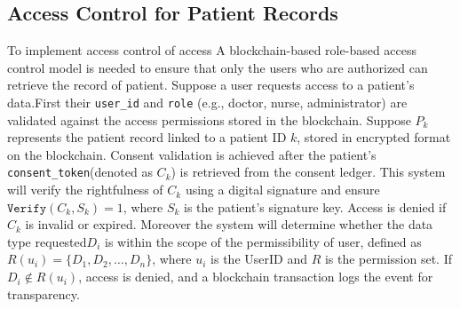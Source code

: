 \documentclass[pdflatex,sn-mathphys-num]{sn-jnl}%
\theoremstyle{thmstyleone}%
\theoremstyle{thmstyletwo}%
\theoremstyle{thmstylethree}%
\begin{document}




\subsection{Access Control for Patient Records}
To implement access control of access A blockchain-based role-based access control model is needed to ensure that only the users who are authorized can retrieve the record of patient\cite{bib17}. Suppose a user requests access to a patient's data.First their \texttt{user\_id} and \texttt{role} (e.g., doctor, nurse, administrator) are validated against the access permissions stored in the blockchain. Suppose \( P_k \) represents the patient record linked to a patient ID \( k \), stored in encrypted format on the blockchain. Consent validation is achieved after the patient’s \texttt{consent\_token}(denoted as \( C_k \)) is retrieved from the consent ledger. This system will verify the rightfulness of \( C_k \) using a digital signature and ensure \( \texttt{Verify}(C_k, S_k) = 1 \), where \( S_k \) is the patient’s signature key\cite{bib17}. Access is denied if \( C_k \) is invalid or expired. Moreover the system will determine whether the data type requested\( D_i \) is within the scope of the permissibility of user, defined as \( R(u_i) = \{D_1, D_2, \dots, D_n\} \), where \( u_i \) is the UserID and \( R \) is the permission set. If \( D_i \notin R(u_i) \), access is denied, and a blockchain transaction logs the event for transparency. 



\end{document}
